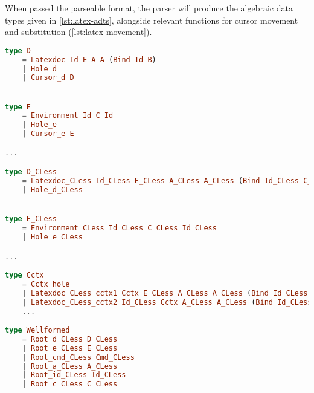 When passed the parseable format, the parser will produce the algebraic data types
given in \cref{lst:latex-adts}, alongside relevant functions for cursor movement and substitution (\cref{lst:latex-movement}).

\begin{minipage}{\textwidth}
    \begin{lstlisting}[style=inline, language=elm, caption={Generated ADT for the \LaTeX \ language}, label={lst:latex-adts}]
type D
    = Latexdoc Id E A A (Bind Id B)
    | Hole_d
    | Cursor_d D


type E
    = Environment Id C Id
    | Hole_e
    | Cursor_e E

...

type D_CLess
    = Latexdoc_CLess Id_CLess E_CLess A_CLess A_CLess (Bind Id_CLess C_CLess)
    | Hole_d_CLess


type E_CLess
    = Environment_CLess Id_CLess C_CLess Id_CLess
    | Hole_e_CLess

...

type Cctx
    = Cctx_hole
    | Latexdoc_CLess_cctx1 Cctx E_CLess A_CLess A_CLess (Bind Id_CLess B_CLess)
    | Latexdoc_CLess_cctx2 Id_CLess Cctx A_CLess A_CLess (Bind Id_CLess B_CLess)
    ...

type Wellformed
    = Root_d_CLess D_CLess
    | Root_e_CLess E_CLess
    | Root_cmd_CLess Cmd_CLess
    | Root_a_CLess A_CLess
    | Root_id_CLess Id_CLess
    | Root_c_CLess C_CLess

\end{lstlisting}
\end{minipage}

\newpage

